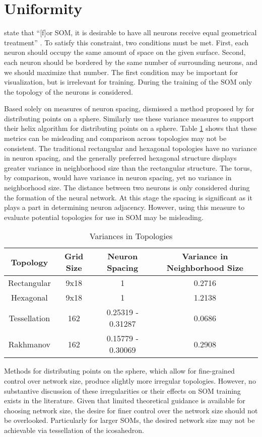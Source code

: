 \section{Uniformity}
\citeauthor{wu2006} state that ``[f]or SOM, it is desirable to have all neurons
receive equal geometrical treatment'' \cite[p. 900]{wu2006}.  To satisfy this
constraint, two conditions must be met.  First, each neuron should occupy the
same amount of space on the given surface.  Second, each neuron should be
bordered by the same number of surrounding neurons, and we should maximize that
number.  The first condition may be important for visualization, but is
irrelevant for training.  During the training of the SOM only the topology of
the neurons is considered.

Based solely on measures of neuron spacing, \cite{wu2005} dismissed a method
proposed by \cite{Rakhmanov94} for distributing points on a sphere.  Similarly
\cite{Nishio:2006fk} use these variance measures to support their helix
algorithm for distributing points on a sphere.  Table \ref{table1} shows that
these metrics can be misleading and comparison across topologies may not be
consistent.
The traditional rectangular and hexagonal topologies have no variance in neuron
spacing, and the generally preferred hexagonal structure displays greater
variance in neighborhood size than the rectangular structure.  The torus, by
comparison, would have variance in neuron spacing, yet no variance in
neighborhood size.  The distance between two neurons is only considered during
the formation of the neural network.  At this stage the spacing is significant
as it plays a part in determining neuron adjacency. However, using this measure
to evaluate potential topologies for use in SOM may be misleading.

\begin{table}[htbp]
\caption{Variances in Topologies}
\begin{center}
\begin{tabular}{|c|c|c|c|}
\hline
Topology&Grid Size&Neuron Spacing&Variance in Neighborhood Size\\
\hline
Rectangular&9x18&1&0.2716\\
Hexagonal&9x18&1&1.2138\\
Tessellation&162&0.25319 - 0.31287& 0.0686\\
Rakhmanov&162&0.15779 - 0.30069& 0.2908\\
\hline
\end{tabular}
\end{center}
\label{table1}
\end{table}

Methods for distributing points on the sphere, which allow for fine-grained
control over network size, produce slightly more irregular topologies.  However,
no substantive discussion of these irregularities or their effects on SOM
training exists in the literature. Given that limited theoretical guidance is available
for choosing network size, the desire for finer control over the network size
should not be overlooked. Particularly for larger SOMs, the desired network size
may not be achievable via tessellation of the icosahedron.

